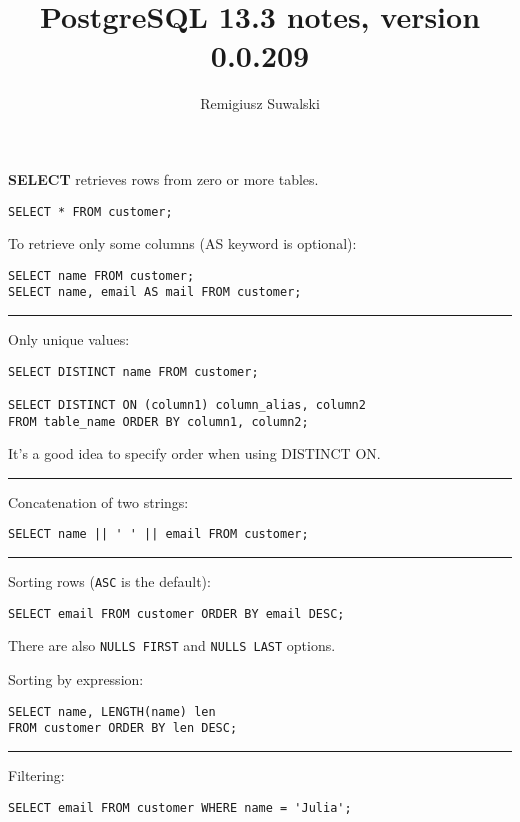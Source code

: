 \documentclass{charun}
\title{PostgreSQL 13.3 notes, version 0.0.209}
\author{Remigiusz Suwalski}
\begin{document}
\begin{multicols*}{2}
\maketitle
\raggedright


\textbf{SELECT} retrieves rows from zero or more tables.
\begin{verbatim}
SELECT * FROM customer;
\end{verbatim}

To retrieve only some columns (AS keyword is optional):
\begin{verbatim}
SELECT name FROM customer;
SELECT name, email AS mail FROM customer;
\end{verbatim}

\hrule

Only unique values:
\begin{verbatim}
SELECT DISTINCT name FROM customer;

SELECT DISTINCT ON (column1) column_alias, column2
FROM table_name ORDER BY column1, column2;
\end{verbatim}

It's a good idea to specify order when using DISTINCT ON.

\hrule

Concatenation of two strings:
\begin{verbatim}
SELECT name || ' ' || email FROM customer;
\end{verbatim}

\hrule

Sorting rows (\texttt{ASC} is the default):
\begin{verbatim}
SELECT email FROM customer ORDER BY email DESC;
\end{verbatim}

There are also \texttt{NULLS FIRST} and \texttt{NULLS LAST} options.

Sorting by expression:
\begin{verbatim}
SELECT name, LENGTH(name) len
FROM customer ORDER BY len DESC;
\end{verbatim}

\hrule

Filtering:
\begin{verbatim}
SELECT email FROM customer WHERE name = 'Julia';
\end{verbatim}


\end{multicols*}
\end{document}
